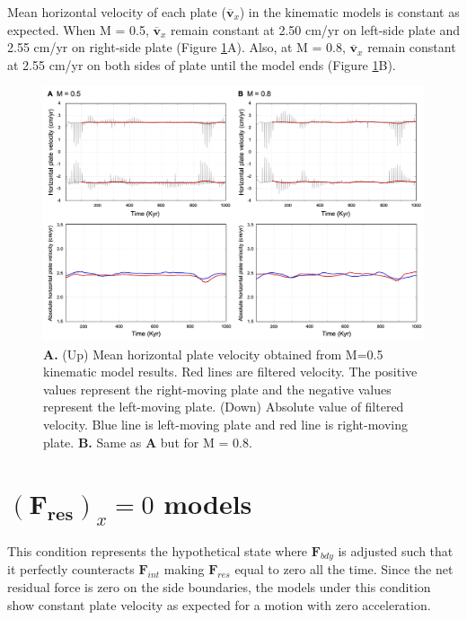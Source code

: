 \documentclass[letterpaper,12pt,notitle]{memphisthesis}                     %
\begin{document}
Mean horizontal velocity of each plate ($\overline{\boldsymbol{v}}_{x}$) in the kinematic models is constant as expected. 
When M = 0.5, $\overline{\boldsymbol{v}}_{x}$ remain constant at 2.50 cm/yr on left-side plate and 2.55 cm/yr on right-side plate (Figure \ref{fig:kmhv}A). Also, at M = 0.8, $\overline{\boldsymbol{v}}_{x}$ remain constant at 2.55 cm/yr on both sides of plate until the model ends (Figure \ref{fig:kmhv}B). %
%
\begin{figure}[!htb]
	\centering
	\includegraphics[width=0.98\linewidth,trim=4 4 4 4,clip]{./figs/kmhv.png}
	\caption{\textbf{A.} (Up) Mean horizontal plate velocity obtained from M=0.5 kinematic model results. Red lines are filtered velocity. The positive values represent the right-moving plate and the negative values represent the left-moving plate. (Down) Absolute value of filtered velocity. Blue line is left-moving plate and red line is right-moving plate. \textbf{B.} Same as \textbf{A} but for M = 0.8.}
	\label{fig:kmhv}
\end{figure}

\section{$(\boldsymbol{F_{res}})_x=0$ models}

This condition represents the hypothetical state where $\boldsymbol{F}_{bdy}$ is adjusted such that it perfectly counteracts $\boldsymbol{F}_{int}$ making $\boldsymbol{F}_{res}$ equal to zero all the time. %
Since the net residual force is zero on the side boundaries, the models under this condition show constant plate velocity as expected for a motion with zero acceleration.
\end{document}
